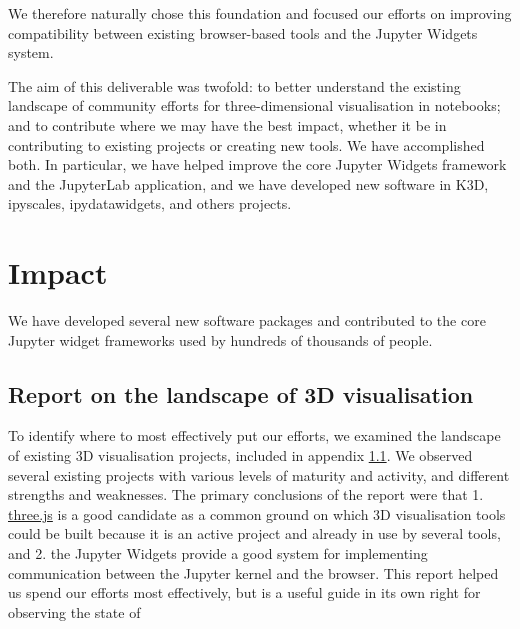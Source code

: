 \documentclass{deliverablereport}
\begin{document}
We therefore naturally chose this foundation and focused our efforts
on improving compatibility between existing browser-based tools and
the Jupyter Widgets system.

The aim of this deliverable was twofold: to better
understand the existing landscape of community efforts for three-dimensional
visualisation in notebooks; and to contribute where we may have the best
impact, whether it be in contributing to existing projects or creating new
tools. We have accomplished both. In particular, we have helped improve the
core Jupyter Widgets framework and the JupyterLab application, and we have
developed new software in K3D, ipyscales, ipydatawidgets, and others projects.



\section{Impact}


We have developed several new software packages and contributed to the core Jupyter widget frameworks used by hundreds of thousands of people.

\subsection{Report on the landscape of 3D visualisation}\label{landscape}

To identify where to most effectively put our efforts,
we examined the landscape of existing 3D visualisation projects,
included in appendix \ref{landscape}.
We observed several existing projects with various levels of maturity and activity, and different strengths and weaknesses.
The primary conclusions of the report were that 1. \href{https://threejs.org}{three.js} is a good candidate as a common ground on which 3D visualisation tools could be built because it is an active project and already in use by several tools, and 2. the Jupyter Widgets provide a good system for implementing communication between the Jupyter kernel and the browser.
This report helped us spend our efforts most effectively,
but is a useful guide in its own right for observing the state
of
\end{document}
